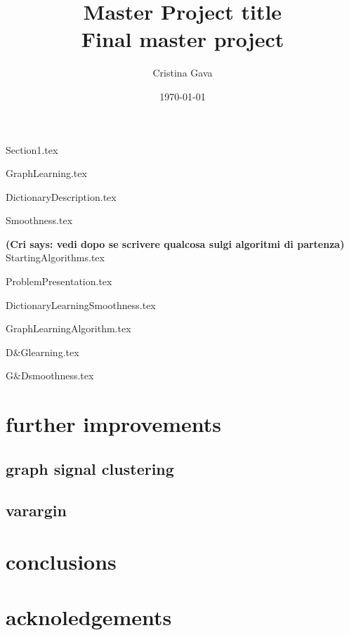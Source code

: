 \documentclass[12pt,a4paper,titlepage]{book}
\title{\blue Master Project title \\
\blueb Final master project}
\author{Cristina Gava}
\date{\today}
\newcommand{\cri}[1]{\textcolor{MyColor2}{\textbf{(Cri says: #1)}}}
\begin{document}
\maketitle

\tableofcontents

{Section1.tex}

{GraphLearning.tex}

{DictionaryDescription.tex}

{Smoothness.tex}

\cri{vedi dopo se scrivere qualcosa sulgi algoritmi di partenza}
{StartingAlgorithms.tex}

{ProblemPresentation.tex}

{DictionaryLearningSmoothness.tex}

{GraphLearningAlgorithm.tex}

{D&Glearning.tex}

{G&Dsmoothness.tex}


\section{further improvements}
\subsection{graph signal clustering}
\subsection{varargin}

\section{conclusions}

\section{acknoledgements}



\end{document}
